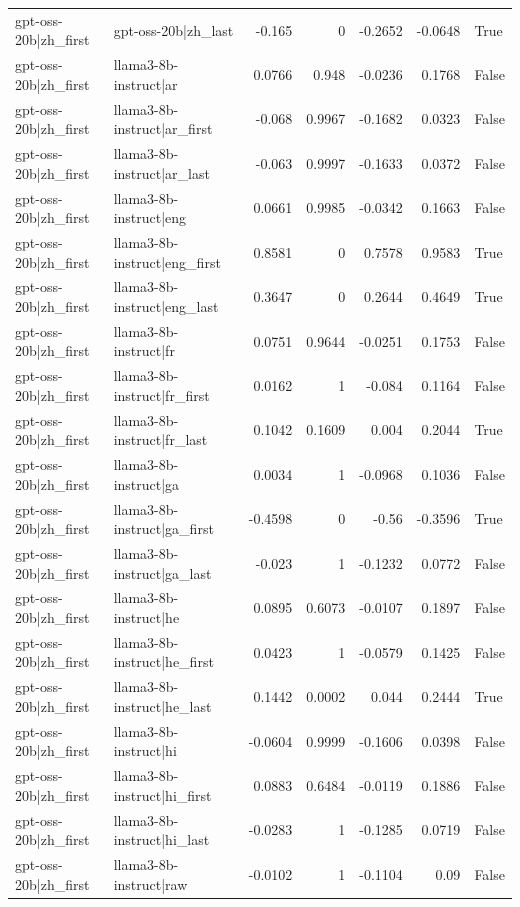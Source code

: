 \begin{table}
\begin{tabular}{l l r r r r l}
gpt-oss-20b|zh_first & gpt-oss-20b|zh_last & -0.165 & 0 & -0.2652 & -0.0648 & True \\
gpt-oss-20b|zh_first & llama3-8b-instruct|ar & 0.0766 & 0.948 & -0.0236 & 0.1768 & False \\
gpt-oss-20b|zh_first & llama3-8b-instruct|ar_first & -0.068 & 0.9967 & -0.1682 & 0.0323 & False \\
gpt-oss-20b|zh_first & llama3-8b-instruct|ar_last & -0.063 & 0.9997 & -0.1633 & 0.0372 & False \\
gpt-oss-20b|zh_first & llama3-8b-instruct|eng & 0.0661 & 0.9985 & -0.0342 & 0.1663 & False \\
gpt-oss-20b|zh_first & llama3-8b-instruct|eng_first & 0.8581 & 0 & 0.7578 & 0.9583 & True \\
gpt-oss-20b|zh_first & llama3-8b-instruct|eng_last & 0.3647 & 0 & 0.2644 & 0.4649 & True \\
gpt-oss-20b|zh_first & llama3-8b-instruct|fr & 0.0751 & 0.9644 & -0.0251 & 0.1753 & False \\
gpt-oss-20b|zh_first & llama3-8b-instruct|fr_first & 0.0162 & 1 & -0.084 & 0.1164 & False \\
gpt-oss-20b|zh_first & llama3-8b-instruct|fr_last & 0.1042 & 0.1609 & 0.004 & 0.2044 & True \\
gpt-oss-20b|zh_first & llama3-8b-instruct|ga & 0.0034 & 1 & -0.0968 & 0.1036 & False \\
gpt-oss-20b|zh_first & llama3-8b-instruct|ga_first & -0.4598 & 0 & -0.56 & -0.3596 & True \\
gpt-oss-20b|zh_first & llama3-8b-instruct|ga_last & -0.023 & 1 & -0.1232 & 0.0772 & False \\
gpt-oss-20b|zh_first & llama3-8b-instruct|he & 0.0895 & 0.6073 & -0.0107 & 0.1897 & False \\
gpt-oss-20b|zh_first & llama3-8b-instruct|he_first & 0.0423 & 1 & -0.0579 & 0.1425 & False \\
gpt-oss-20b|zh_first & llama3-8b-instruct|he_last & 0.1442 & 0.0002 & 0.044 & 0.2444 & True \\
gpt-oss-20b|zh_first & llama3-8b-instruct|hi & -0.0604 & 0.9999 & -0.1606 & 0.0398 & False \\
gpt-oss-20b|zh_first & llama3-8b-instruct|hi_first & 0.0883 & 0.6484 & -0.0119 & 0.1886 & False \\
gpt-oss-20b|zh_first & llama3-8b-instruct|hi_last & -0.0283 & 1 & -0.1285 & 0.0719 & False \\
gpt-oss-20b|zh_first & llama3-8b-instruct|raw & -0.0102 & 1 & -0.1104 & 0.09 & False \\

\end{tabular}
\end{table}
